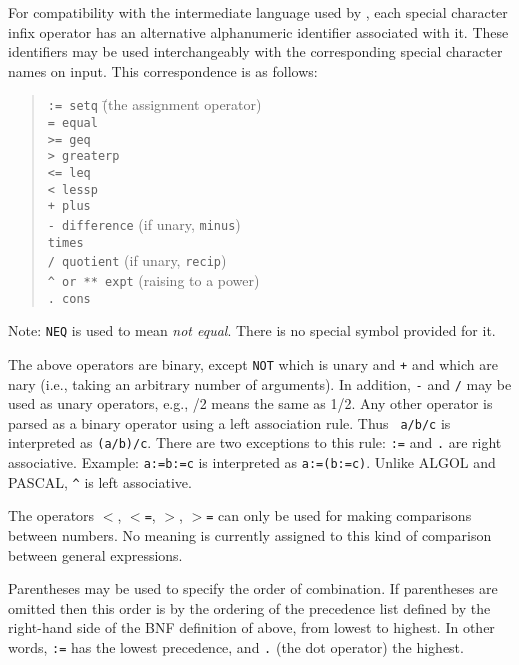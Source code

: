 For compatibility with the intermediate language used by {\REDUCE}, each
special character infix operator has an alternative
alphanumeric identifier associated with it.  These identifiers may be used
interchangeably with the corresponding special character names on input.
This correspondence is as follows:
\begin{quote}
\begin{tabbing}
{\tt :=      setq} \hspace{0.5in} \= (the assignment operator) \\
{\tt =       equal} \\
{\tt >=      geq} \\
{\tt >       greaterp} \\
{\tt <=      leq} \\
{\tt <       lessp} \\
{\tt +       plus} \\
{\tt -       difference} \> (if unary, {\tt minus}) \\
{\tt *       times} \\
{\tt /       quotient} \> (if unary, {\tt recip}) \\
{\tt \^{ } or ** expt} \> (raising to a power) \\
{\tt .       cons}
\end{tabbing}
\end{quote}
Note: {\tt NEQ} is used to mean {\em not equal}.  There is no special
symbol provided for it.

The above operators are binary, except {\tt NOT} which is
unary and {\tt +} and {\tt *} which are nary (i.e., taking an arbitrary
number of arguments).  In addition, {\tt -} and {\tt /} may be used as
unary operators, e.g., /2 means the same as 1/2.  Any other operator is
parsed as a binary operator using a left association rule.  Thus {\tt
a/b/c} is interpreted as {\tt (a/b)/c}.  There are two exceptions to this
rule: {\tt :=} and {\tt .} are right associative.  Example: {\tt a:=b:=c}
is interpreted as {\tt a:=(b:=c)}.  Unlike ALGOL and PASCAL, {\tt \^{ }} is
left associative.

The operators {\tt $<$}, {\tt $<$=}, {\tt $>$}, {\tt $>$=}
can only be used for making comparisons between numbers.  No meaning is
currently assigned to this kind of comparison between general expressions.

Parentheses may be used to specify the order of combination.  If
parentheses are omitted then this order is by the ordering of the
precedence list defined by the right-hand side
of the BNF definition of {\tt <infix operator>}
above, from lowest to highest.  In other words, {\tt :=} has the lowest
precedence, and {\tt .} (the dot operator) the highest.

